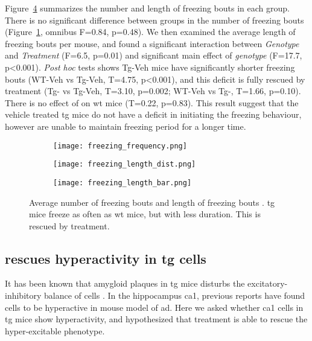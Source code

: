 Figure~\ref{f.ad.freezing_profile} summarizes the number and length of freezing bouts in each group. There is no significant difference between groups in the number of freezing bouts (Figure~\ref{f.ad.freezing_freq}, omnibus F=0.84, p=0.48). We then examined the average length of freezing bouts per mouse, and found a significant interaction between \textit{Genotype} and \textit{Treatment} (F=6.5, p=0.01) and significant main effect of \textit{genotype} (F=17.7, p<0.001). \textit{Post hoc} tests shows Tg-Veh mice have significantly shorter freezing bouts (WT-Veh vs Tg-Veh, T=4.75, p<0.001), and this deficit is fully rescued by \tglu{} treatment (Tg-\glu{} vs Tg-Veh, T=3.10, p=0.002; WT-Veh vs Tg-\glu, T=1.66, p=0.10). There is no effect of \tglu{} on \gls{wt} mice (T=0.22, p=0.83). This result suggest that the vehicle treated \gls{tg} mice do not have a deficit in initiating the freezing behaviour, however are unable to maintain freezing period for a longer time. 

\begin{figure}[h]
    \begin{subfigure}[h]{\textwidth}
        \texttt{[image: freezing\_frequency.png]}
        \caption{\label{f.ad.freezing_freq}}
    \end{subfigure}
    \begin{subfigure}[h]{0.4\textwidth}
        \texttt{[image: freezing\_length\_dist.png]}
        \caption{\label{f.ad.freezing_length_dist}}
    \end{subfigure}
    \begin{subfigure}[h]{0.6\textwidth}
        \texttt{[image: freezing\_length\_bar.png]}
        \caption{\label{f.ad.freezing_length_bar}}
    \end{subfigure}
    \caption[Freezing lengths and number of freezing bouts.]{Average number of freezing bouts  and length of freezing bouts . \Gls{tg} mice freeze as often as \gls{wt} mice, but with less duration. This is rescued by \tglu{} treatment. \label{f.ad.freezing_profile}}
\end{figure}


\subsection{\tglu{} rescues hyperactivity in \gls{tg} cells}

It has been known that amygloid plaques in \gls{tg} mice disturbs the excitatory-inhibitory balance of cells \citep{palop16}. In the hippocampus \gls{ca1}, previous reports have found cells to be hyperactive in mouse model of \gls{ad}. Here we asked whether \gls{ca1} cells in \gls{tg} mice show hyperactivity, and hypothesized that \tglu{} treatment is able to rescue the hyper-excitable phenotype.


